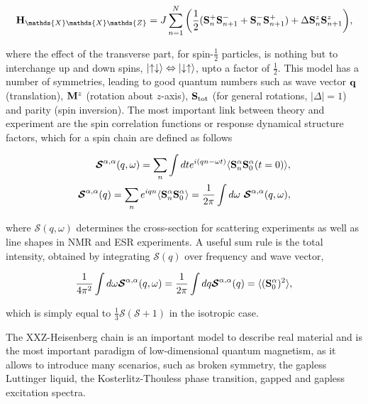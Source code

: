 \documentclass{homework}
\begin{document}
\begin{equation}
    \Hamiltonian_{\mathds{X}\mathds{X}\mathds{Z}} = J \sum_{n=1}^{N} \bigg( \frac{1}{2} (\spin^{+}_{n} \spin^{-}_{n+1} + \spin^{-}_{n} \spin^{+}_{n+1}) + \Delta \spin^{z}_{n} \spin_{n+1}^{z} \bigg),
\end{equation}

where the effect of the transverse part, for spin-$\frac{1}{2}$ particles, is nothing but to interchange up and down spins, $\ket{\uparrow\downarrow} \Leftrightarrow \ket{\downarrow\uparrow}$, upto a factor of $\frac{1}{2}$. This model has a number of symmetries, leading to good quantum numbers such as wave vector ${\bf q}$ (translation), ${\bf M}^z$ (rotation about $z$-axis), ${\bf S}_{\textnormal{tot}}$ (for general rotations, $|\Delta| = 1$) and parity (spin inversion). The most important link between theory and experiment are the spin correlation functions or response dynamical structure factors, which for a spin chain are defined as follows

\begin{equation}
    \begin{split}
        \bm{\mathcal S}^{\alpha, \alpha}(q, \omega) = \sum_{n} \int dt e^{i(qn-\omega t)} \langle {\bf S}_n^{\alpha} {\bf S}_{0}^{\alpha}(t=0) \rangle, \\
        \bm{\mathcal S}^{\alpha, \alpha}(q) = \sum_{n} e^{iqn} \langle {\bf S}_n^{\alpha} {\bf S}_{0}^{\alpha} \rangle = \frac{1}{2\pi} \int d\omega \textnormal{ } \bm{\mathcal S}^{\alpha, \alpha}(q, \omega),
    \end{split}
\end{equation}

where $\bm{\mathcal S}(q, \omega)$ determines the cross-section for scattering experiments as well as line shapes in NMR and ESR experiments. A useful sum rule is the total intensity, obtained by integrating $\bm{\mathcal S}(q)$ over frequency and wave vector, 

\begin{equation}
    \frac{1}{4\pi^2} \int d\omega \bm{\mathcal S}^{\alpha, \alpha}(q, \omega) = \frac{1}{2 \pi} \int dq \bm{\mathcal S}^{\alpha, \alpha}(q) = \langle ({\bf S}_0^\alpha)^2 \rangle,
\end{equation}

which is simply equal to $\frac{1}{3} \bm{\mathcal S}( \bm{\mathcal S}+ 1)$ in the isotropic case. \\

\begin{tcolorbox}[colback =yellow, title = Physical Context]

The XXZ-Heisenberg chain is an important model to describe real material and is the most important paradigm of low-dimensional quantum magnetism, as it allows to introduce many scenarios, such as broken symmetry, the gapless Luttinger liquid, the Kosterlitz-Thouless phase transition, gapped and gapless excitation spectra.

\end{tcolorbox}
\end{document}
